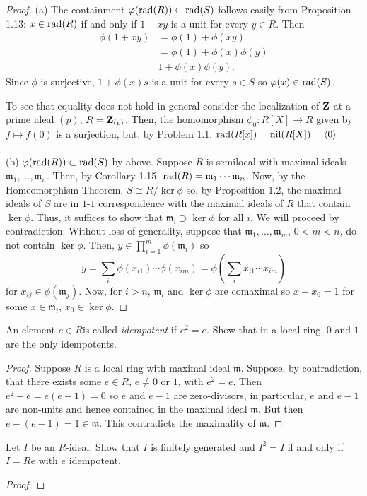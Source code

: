 \begin{proof}
(a) The containment $\varphi(\mathrm{rad}(R))\subset\mathrm{rad}(S)$ follows easily
from Proposition 1.13: $x\in\mathrm{rad}(R)$ if and only if $1+xy$ is a
unit for every $y\in R$. Then
\begin{align*}
\phi(1+xy)&=\phi(1)+\phi(xy)\\
             &=\phi(1)+\phi(x)\phi(y)\\
             &1+\phi(x)\phi(y).
\end{align*}
Since $\phi$ is surjective, $1+\phi(x)s$ is a unit for every
$s\in S$ so $\varphi(x)\in\mathrm{rad}(S)$.

To see that equality does not hold in general consider the
localization of $\mathbf{Z}$ at a prime ideal $(p)$,
$R=\mathbf{Z}_{(p)}$. Then, the homomorphism $\phi_0\colon R[X]\to R$
given by $f\mapsto f(0)$ is a surjection, but, by Problem 1.1,
$\mathrm{rad}(R[x])=\mathrm{nil}(R[X])=\langle 0\rangle$
\\\\
(b) $\varphi(\mathrm{rad}(R))\subset\mathrm{rad}(S)$ by above. Suppose $R$ is
semilocal with maximal ideals
$\mathfrak{m}_1,...,\mathfrak{m}_n$. Then, by Corollary 1.15,
$\mathrm{rad}(R)=\mathfrak{m}_1\cdots\mathfrak{m}_n$. Now, by the
Homeomorphism Theorem, $S\cong R/\ker\phi$ so, by Proposition
1.2, the maximal ideals of $S$ are in $1$-$1$ correspondence with
the maximal ideals of $R$ that contain $\ker\phi$. Thus, it
suffices to show that $\mathfrak{m}_i\supset\ker\phi$ for all
$i$. We will proceed by contradiction. Without loss of
generality, suppose that $\mathfrak{m}_1,...,\mathfrak{m}_m$,
$0<m<n$, do not contain $\ker\phi$. Then,
$y\in\prod_{i=1}^m\phi(\mathfrak{m}_i)$ so
\[
y
=
\sum_i\phi(x_{i1})\cdots\phi(x_{im})
=
\phi\left(\sum_i x_{i1}\cdots x_{im}\right)
\]
for $x_{ij}\in\phi(\mathfrak{m}_j)$. Now, for $i>n$,
$\mathfrak{m}_i$ and $\ker\phi$ are comaximal so $x+x_0=1$ for
some $x\in\mathfrak{m}_i$, $x_0\in\ker\phi$.
\end{proof}
\newpage
\begin{problem}
An element $e\in R$is called \emph{idempotent} if $e^2=e$. Show
that in a local ring, $0$ and $1$ are the only idempotents.
\end{problem}
\begin{proof}
Suppose $R$ is a local ring with maximal ideal
$\mathfrak{m}$. Suppose, by contradiction, that there exists some
$e\in R$, $e\neq 0$ or $1$, with $e^2=e$. Then $e^2-e=e(e-1)=0$
so $e$ and $e-1$ are zero-divisors, in particular, $e$ and $e-1$
are non-units and hence contained in the maximal ideal
$\mathfrak{m}$. But then $e-(e-1)=1\in\mathfrak{m}$. This
contradicts the maximality of $\mathfrak{m}$.
\end{proof}
\newpage
\begin{problem}
Let $I$ be an $R$-ideal. Show that $I$ is finitely generated and
$I^2=I$ if and only if $I=Re$ with $e$ idempotent.
\end{problem}
\begin{proof}

\end{proof}

